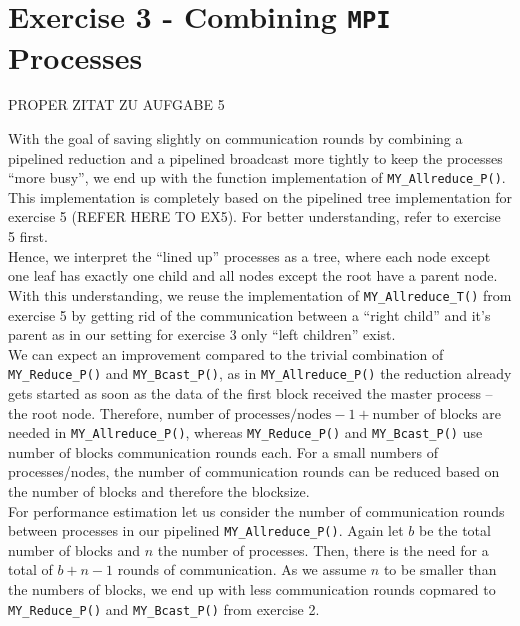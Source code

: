 \section{Exercise 3 - Combining \texttt{MPI} Processes}

PROPER ZITAT ZU AUFGABE 5

With the goal of saving slightly on communication rounds by combining a pipelined reduction and a 
pipelined broadcast more tightly to keep the processes “more busy”, we end up with the function implementation 
of \texttt{MY\_Allreduce\_P()}. This implementation is completely based on the pipelined tree 
implementation for exercise 5 (REFER HERE TO EX5). For better understanding, refer to exercise 5 first.\\

Hence, we interpret the “lined up” processes as a tree, where each node except one leaf has exactly 
one child and all nodes except the root have a parent node. With this understanding, we reuse the 
implementation of \texttt{MY\_Allreduce\_T()} from exercise 5 by getting rid of the communication between 
a “right child” and it’s parent as in our setting for exercise 3 only “left children” exist.\\

We can expect an improvement compared to the trivial combination of \texttt{MY\_Reduce\_P()} and 
\texttt{MY\_Bcast\_P()}, as in \texttt{MY\_Allreduce\_P()} the reduction already gets started as soon 
as the data of the first block received the master process -- the root node. Therefore, 
$\text{number of processes/nodes} - 1 + \text{number of blocks}$ are needed in \texttt{MY\_Allreduce\_P()}, 
whereas \texttt{MY\_Reduce\_P()} and \texttt{MY\_Bcast\_P()} use $\text{number of blocks}$ communication rounds 
each. For a small numbers of processes/nodes, the number of communication rounds can be reduced based 
on the number of blocks and therefore the blocksize.\\

For performance estimation let us consider the number of communication rounds between processes in our
pipelined \texttt{MY\_Allreduce\_P()}. Again let $b$ be the total number of blocks and $n$ the 
number of processes. Then, there is the need for a total of $b+n-1$ rounds of communication. 
As we assume $n$ to be smaller than the numbers of blocks, we end up with less communication rounds
copmared to \texttt{MY\_Reduce\_P()} and \texttt{MY\_Bcast\_P()} from exercise 2.\\

